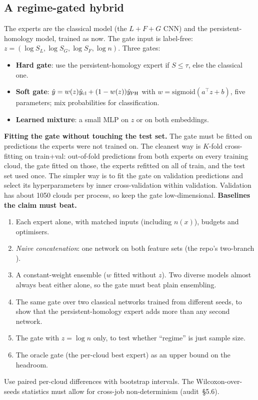 \documentclass[10pt,a4paper]{article}
\newcommand{\code}[1]{\texttt{\detokenize{#1}}}
\begin{document}
\subsection{A regime-gated hybrid}\label{sec:hybrid}
The experts are the classical model (the $L{+}F{+}G$ CNN) and the persistent-homology model, trained as now. The gate input is label-free: $z=(\log S_L,\log S_G,\log S_F,\log n)$. Three gates:
\begin{itemize}
  \item \textbf{Hard gate}: use the persistent-homology expert if $S\le\tau$, else the classical one.
  \item \textbf{Soft gate}: $\hat y=w(z)\hat y_{\rm cl}+(1-w(z))\hat y_{\rm PH}$ with $w=\mathrm{sigmoid}(a^\top z+b)$, five parameters; mix probabilities for classification.
  \item \textbf{Learned mixture}: a small MLP on $z$ or on both embeddings.
\end{itemize}
\textbf{Fitting the gate without touching the test set.} The gate must be fitted on predictions the experts were not trained on. The cleanest way is $K$-fold cross-fitting on train+val: out-of-fold predictions from both experts on every training cloud, the gate fitted on those, the experts refitted on all of train, and the test set used once. The simpler way is to fit the gate on validation predictions and select its hyperparameters by inner cross-validation within validation. Validation has about 1050 clouds per process, so keep the gate low-dimensional.
\textbf{Baselines the claim must beat.}
\begin{enumerate}
  \item Each expert alone, with matched inputs (including $n(x)$), budgets and optimisers.
  \item \emph{Naive concatenation}: one network on both feature sets (the repo's two-branch \code{tb__PHcurves}).
  \item A constant-weight ensemble ($w$ fitted without $z$). Two diverse models almost always beat either alone, so the gate must beat plain ensembling.
  \item The same gate over two classical networks trained from different seeds, to show that the persistent-homology expert adds more than any second network.
  \item The gate with $z=\log n$ only, to test whether ``regime'' is just sample size.
  \item The oracle gate (the per-cloud best expert) as an upper bound on the headroom.
\end{enumerate}
Use paired per-cloud differences with bootstrap intervals. The Wilcoxon-over-seeds statistics must allow for cross-job non-determinism (audit~\S5.6).
\end{document}
